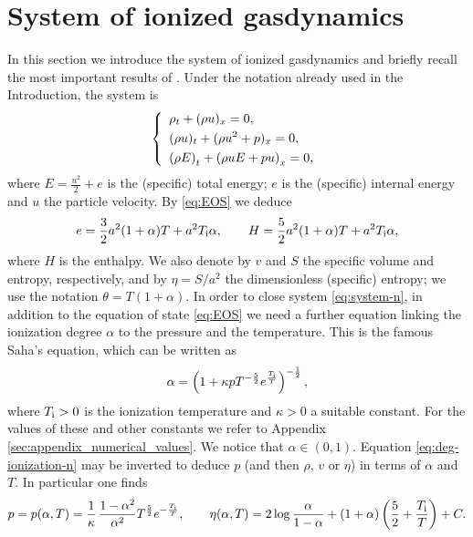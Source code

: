 \documentclass[10pt,a4paper]{article}
\numberwithin{equation}{section}
\newcommand{\ds}{\displaystyle}
\newcommand{\Ti}{T_{\rm i}}
\newcommand{\qq}{\left(\frac52+\frac{\Ti}{T}\right)}
\begin{document}
\section{System of ionized gasdynamics}\label{sec:ionized-gasdynamics}
\setcounter{equation}{0}
In this section we introduce the system of ionized gasdynamics and briefly recall the most important results of \cite{Asakura-Corli_ionized}. Under the notation already used in the Introduction, the system is
\begin{equation}\label{eq:system-n}
\left\{
\begin{array}{l}
\rho_t + (\rho u)_x = 0,
\\
\ds(\rho u)_t + (\rho u^2 + p)_x = 0,\rule{0ex}{2.75ex}
\\
\ds\left(\rho E\right)_t + \left(\rho u E + pu\right)_x = 0,\rule{0ex}{2.75ex}
\end{array}
\right.
\end{equation}
where $E = \frac{u^2}{2} + e$ is the (specific) total energy; $e$ is the (specific) internal energy and $u$ the particle velocity. By \eqref{eq:EOS} we deduce 
\begin{equation}\label{eq:e-n}
e  =  \frac32a^2(1+\alpha)T + a^2T_{\rm i}\alpha,
\qquad
H  =  \frac52a^2(1+\alpha)T + a^2T_{\rm i}\alpha, 
\end{equation}
where $H$ is the enthalpy. We also denote by $v$ and $S$ the specific volume and entropy, respectively, and by $\eta= S/a^2$ the dimensionless (specific) entropy; we use the notation $\theta = T(1 + \alpha)$.  In order to close system \eqref{eq:system-n}, in addition to the equation of state \eqref{eq:EOS} we need a further equation linking the ionization degree $\alpha$ to the pressure and the temperature. This is the famous Saha's equation, which can be written as 
\begin{equation}\label{eq:deg-ionization-n}
    \alpha = \left(1 + \kappa pT^{-\frac{5}{2}}e^{\frac{\Ti }{T}}\right)^{-\frac{1}{2}},
\end{equation}
where $T_{\rm i}>0$ is the ionization temperature and $\kappa>0$ a suitable constant. For the values of these and other constants we refer to Appendix \ref{sec:appendix_numerical_values}. We notice that $\alpha\in(0,1)$. Equation \eqref{eq:deg-ionization-n} may be inverted to deduce $p$ (and then $\rho$, $v$ or $\eta$) in terms of $\alpha$ and $T$. In particular one finds \cite[(3.9) and (3.14)]{Asakura-Corli_ionized}
\begin{equation}\label{eq:p-alphaT}
    p = p(\alpha, T) = \frac1\kappa\,\frac{1 - \alpha^2}{\alpha^2}T^{\frac{5}{2}}e^{-\frac{\Ti }{T}},
    \qquad
    \eta(\alpha,T) =  2\log \frac{\alpha}{1 - \alpha} +  (1 + \alpha)\qq  + C.
\end{equation}
\end{document}
